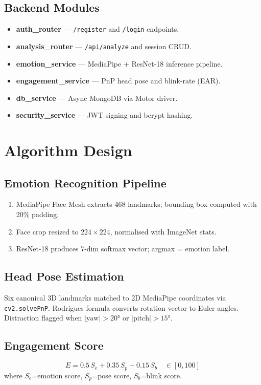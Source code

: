 \subsection{Backend Modules}
\begin{itemize}
    \item \textbf{auth\_router} — \texttt{/register} and \texttt{/login} endpoints.
    \item \textbf{analysis\_router} — \texttt{/api/analyze} and session CRUD.
    \item \textbf{emotion\_service} — MediaPipe + ResNet-18 inference pipeline.
    \item \textbf{engagement\_service} — PnP head pose and blink-rate (EAR).
    \item \textbf{db\_service} — Async MongoDB via Motor driver.
    \item \textbf{security\_service} — JWT signing and bcrypt hashing.
\end{itemize}

\section{Algorithm Design}

\subsection{Emotion Recognition Pipeline}
\begin{enumerate}
    \item MediaPipe Face Mesh extracts 468 landmarks; bounding box computed
          with 20\% padding.
    \item Face crop resized to $224\times224$, normalised with ImageNet stats.
    \item ResNet-18 produces 7-dim softmax vector; argmax = emotion label.
\end{enumerate}

\subsection{Head Pose Estimation}
Six canonical 3D landmarks matched to 2D MediaPipe coordinates via
\texttt{cv2.solvePnP}. Rodrigues formula converts rotation vector to Euler
angles. Distraction flagged when $|\text{yaw}|>20°$ or $|\text{pitch}|>15°$.

\subsection{Engagement Score}
\[
E = 0.5\,S_e + 0.35\,S_p + 0.15\,S_b \quad \in [0,100]
\]
where $S_e$=emotion score, $S_p$=pose score, $S_b$=blink score.


